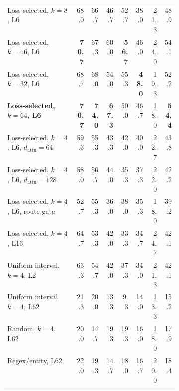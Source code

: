\documentclass[10pt]{article}
\begin{document}
\begin{table}[t]
\begin{tabular}{>{\raggedright\arraybackslash}p{0.40\linewidth}rrrrrrr}
Loss-selected, $k=8$, L6 & 68.0 & 66.7 & 46.7 & 52.7 & 38.0 & 21.3 & 48.9 \\
Loss-selected, $k=16$, L6 & \textbf{70.7} & 67.3 & 60.0 & \textbf{56.7} & 46.0 & 24.0 & 54.1 \\
Loss-selected, $k=32$, L6 & 68.7 & 68.0 & 54.0 & 55.3 & \textbf{48.0} & 19.3 & 52.2 \\
\textbf{Loss-selected, $k=64$, L6} & \textbf{70.7} & \textbf{74.0} & \textbf{67.3} & 50.0 & 46.7 & 18.0 & \textbf{54.4} \\
Loss-selected, $k=4$, L6, $d_{\mathrm{attn}}=64$ & 59.3 & 55.3 & 43.3 & 42.0 & 40.0 & 22.7 & 43.8 \\
Loss-selected, $k=4$, L6, $d_{\mathrm{attn}}=128$ & 58.0 & 56.7 & 44.0 & 35.3 & 37.3 & 22.0 & 42.2 \\
Loss-selected, $k=4$, L6, route gate & 52.7 & 55.3 & 36.0 & 38.0 & 35.3 & 18.0 & 39.2 \\
Loss-selected, $k=4$, L16 & 64.7 & 53.3 & 42.0 & 33.3 & 34.7 & 24.7 & 42.1 \\
Uniform interval, $k=4$, L2 & 63.3 & 54.7 & 42.0 & 37.3 & 34.0 & 21.3 & 42.1 \\
Uniform interval, $k=4$, L62 & 21.3 & 20.0 & 13.3 & 9.3 & 14.0 & 13.3 & 15.2 \\
Random, $k=4$, L62 & 20.0 & 14.7 & 19.3 & 19.3 & 16.0 & 18.0 & 17.9 \\
Regex/entity, L62 & 22.0 & 19.3 & 14.7 & 18.0 & 16.7 & 20.0 & 18.4 \\
\bottomrule
\end{tabular}
\end{table}
\end{document}
